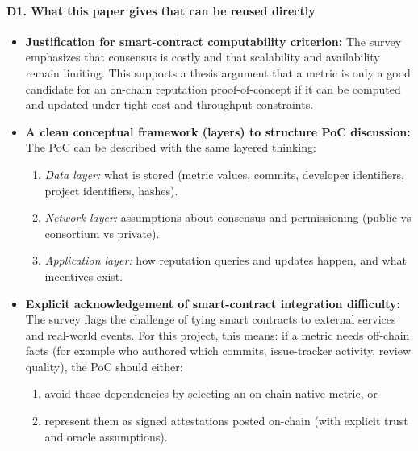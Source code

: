 \documentclass[11pt,a4paper]{article}
\begin{document}
\paragraph{D1. What this paper gives that can be reused directly}
\begin{itemize}[leftmargin=*]
  \item \textbf{Justification for smart-contract computability criterion:} The survey emphasizes that consensus is costly and that scalability and availability remain limiting. This supports a thesis argument that a metric is only a good candidate for an on-chain reputation proof-of-concept if it can be computed and updated under tight cost and throughput constraints.
  \item \textbf{A clean conceptual framework (layers) to structure PoC discussion:} The PoC can be described with the same layered thinking:
  \begin{enumerate}[leftmargin=*]
    \item \emph{Data layer:} what is stored (metric values, commits, developer identifiers, project identifiers, hashes).
    \item \emph{Network layer:} assumptions about consensus and permissioning (public vs consortium vs private).
    \item \emph{Application layer:} how reputation queries and updates happen, and what incentives exist.
  \end{enumerate}
  \item \textbf{Explicit acknowledgement of smart-contract integration difficulty:} The survey flags the challenge of tying smart contracts to external services and real-world events. For this project, this means: if a metric needs off-chain facts (for example who authored which commits, issue-tracker activity, review quality), the PoC should either:
  \begin{enumerate}[leftmargin=*]
    \item avoid those dependencies by selecting an on-chain-native metric, or
    \item represent them as signed attestations posted on-chain (with explicit trust and oracle assumptions).
  \end{enumerate}
\end{itemize}
\end{document}
